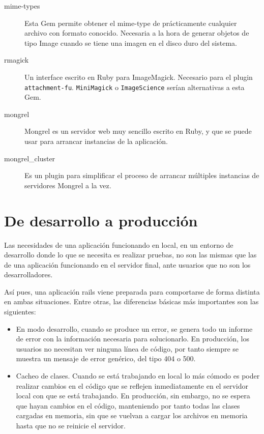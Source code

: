 \begin{description}
  \item[mime-types] Esta Gem permite obtener el mime-type de prácticamente cualquier archivo con formato conocido. Necesaria a la hora de generar objetos de tipo Image cuando se tiene una imagen en el disco duro del sistema.
  \item[rmagick] Un interface escrito en Ruby para ImageMagick. Necesario para el plugin \texttt{attachment-fu}. \texttt{MiniMagick} o \texttt{ImageScience} serían alternativas a esta Gem.
  \item[mongrel] Mongrel es un servidor web muy sencillo escrito en Ruby, y que se puede usar para arrancar instancias de la aplicación. 
  \item[mongrel\_cluster] Es un plugin para simplificar el proceso de arrancar múltiples instancias de servidores Mongrel a la vez.
  
\end{description}



\section{De desarrollo a producción} %
\label{sec:producción}

Las necesidades de una aplicación funcionando en local, en un entorno de desarrollo donde lo que se necesita es realizar pruebas, no son las mismas que las de una aplicación funcionando en el servidor final, ante usuarios que no son los desarrolladores.

Así pues, una aplicación rails viene preparada para comportarse de forma distinta en ambas situaciones. Entre otras, las diferencias básicas más importantes son las siguientes:

\begin{itemize}
  \item En modo desarrollo, cuando se produce un error, se genera todo un informe de error con la información necesaria para solucionarlo. En producción, los usuarios no necesitan ver ninguna línea de código, por tanto siempre se muestra un mensaje de error genérico, del tipo 404 o 500.
  \item Cacheo de clases. Cuando se está trabajando en local lo más cómodo es poder realizar cambios en el código que se reflejen inmediatamente en el servidor local con que se está trabajando. En producción, sin embargo, no se espera que hayan cambios en el código, manteniendo por tanto todas las clases cargadas en memoria, sin que se vuelvan a cargar los archivos en memoria hasta que no se reinicie el servidor.
\end{itemize}

